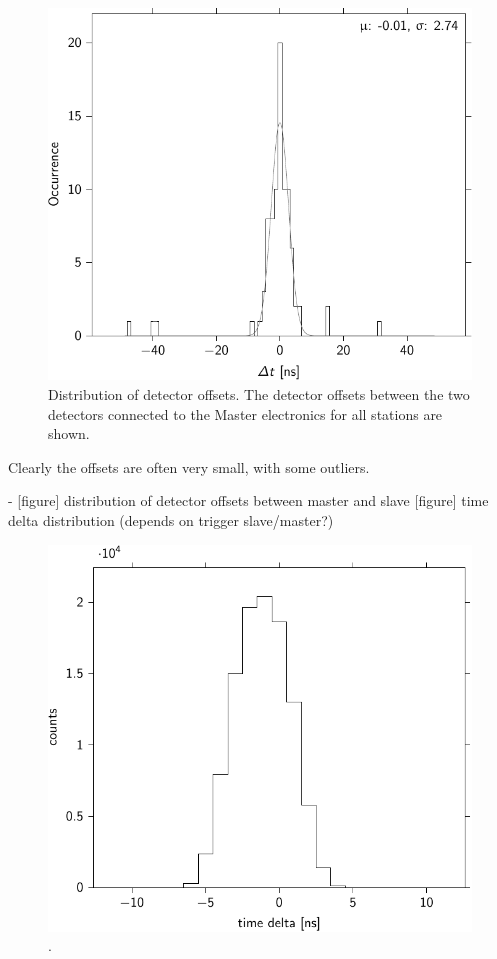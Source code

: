 \begin{figure}
    \centering
    \includegraphics{plots/station/detector_offset_distribution}
    \caption{Distribution of detector offsets. The detector offsets between the two detectors connected to the Master electronics for all \hisparc stations are shown.}
    \label{fig:detector_offset_distribution}
\end{figure}

Clearly the offsets are often very small, with some outliers.

- [figure] distribution of detector offsets between master and slave
  [figure] time delta distribution (depends on trigger slave/master?)


\begin{figure}
    \centering
    \includegraphics{plots/station/time_delta_501}
    \caption{.}
    \label{fig:time_delta_501}
\end{figure}


